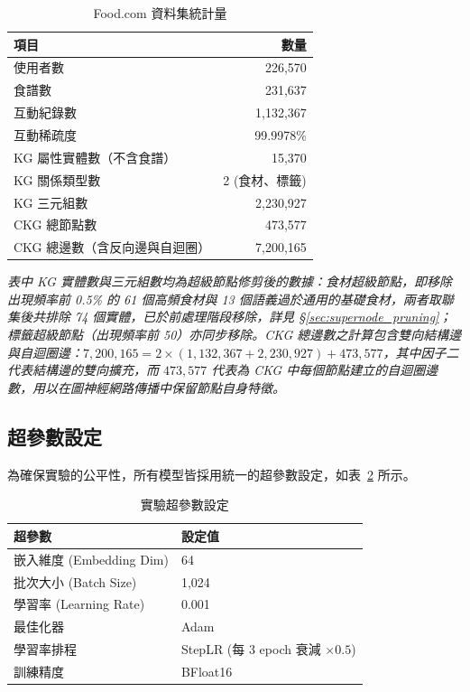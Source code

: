 \begin{table}[htbp]
  \centering
  \caption{Food.com 資料集統計量}
  \label{tab:dataset}
  \begin{tabular}{lr}
    \toprule
    項目 & 數量 \\
    \midrule
    使用者數 & 226,570 \\
    食譜數 & 231,637 \\
    互動紀錄數 & 1,132,367 \\
    互動稀疏度 & 99.9978\% \\
    \midrule
    KG 屬性實體數（不含食譜） & 15,370 \\
    KG 關係類型數 & 2 (食材、標籤) \\
    KG 三元組數 & 2,230,927 \\
    CKG 總節點數 & 473,577 \\
    CKG 總邊數（含反向邊與自迴圈） & 7,200,165 \\
    \bottomrule
  \end{tabular}
  \par\vspace{4pt}
  \begin{minipage}{0.9\linewidth}
    \footnotesize \textit{表中 KG 實體數與三元組數均為超級節點修剪後的數據：食材超級節點，即移除出現頻率前 0.5\% 的 61 個高頻食材與 13 個語義過於通用的基礎食材，兩者取聯集後共排除 74 個實體，已於前處理階段移除，詳見 §\ref{sec:supernode_pruning}；標籤超級節點（出現頻率前 50）亦同步移除。CKG 總邊數之計算包含雙向結構邊與自迴圈邊：$7{,}200{,}165 = 2 \times (1{,}132{,}367 + 2{,}230{,}927) + 473{,}577$，其中因子二代表結構邊的雙向擴充，而 $473{,}577$ 代表為 CKG 中每個節點建立的自迴圈邊數，用以在圖神經網路傳播中保留節點自身特徵。}
  \end{minipage}
\end{table}

\subsection*{超參數設定}

為確保實驗的公平性，所有模型皆採用統一的超參數設定，如表~\ref{tab:hyperparams} 所示。

\begin{table}[htbp]
  \centering
  \caption{實驗超參數設定}
  \label{tab:hyperparams}
  \begin{tabular}{ll}
    \toprule
    超參數 & 設定值 \\
    \midrule
    嵌入維度 (Embedding Dim) & 64 \\
    批次大小 (Batch Size) & 1,024 \\
    學習率 (Learning Rate) & 0.001 \\
    最佳化器 & Adam \\
    學習率排程 & StepLR (每 3 epoch 衰減 $\times 0.5$) \\
    訓練精度 & BFloat16 \\
    \bottomrule
  \end{tabular}
\end{table}

